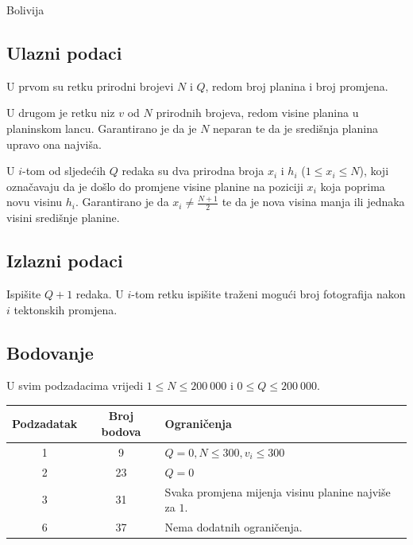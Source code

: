 \begin{statement}[
  problempoints=100,
  timelimit=1 sekunda,
  memorylimit=512 MiB,
]{Bolivija}
\subsection*{Ulazni podaci}

U prvom su retku prirodni brojevi $N$ i $Q$, redom broj planina i broj promjena.

U drugom je retku niz $v$ od $N$ prirodnih brojeva, redom visine planina u planinskom lancu. 
Garantirano je da je $N$ neparan te da je središnja planina upravo ona najviša. 

U $i$-tom od sljedećih $Q$ redaka su dva prirodna broja $x_i$ i $h_i$ ($1 \leq x_i \leq N$), 
koji označavaju da je došlo do promjene visine planine na poziciji $x_i$ koja poprima 
novu visinu $h_i$. Garantirano je da $x_i \ne \frac{N+1}{2}$ te da je nova visina manja 
ili jednaka visini središnje planine. 

\subsection*{Izlazni podaci}

Ispišite $Q + 1$ redaka. U $i$-tom retku ispišite traženi mogući broj fotografija 
nakon $i$ tektonskih promjena. 

\subsection*{Bodovanje}

U svim podzadacima vrijedi $1 \leq N \leq 200~000$ i $0 \leq Q \leq 200~000$.

{\renewcommand{\arraystretch}{1.4}
  \setlength{\tabcolsep}{6pt}
  \begin{tabular}{ccl}
   Podzadatak & Broj bodova & Ograničenja \\ \midrule
    1 & 9 & $Q = 0, N \leq 300, v_i \leq 300$ \\
    2 & 23 & $Q = 0$ \\
    3 & 31 & Svaka promjena mijenja visinu planine najviše za $1$.  \\
    6 & 37 & Nema dodatnih ograničenja. \\
\end{tabular}}


\end{statement}
